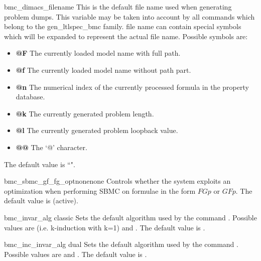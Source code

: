 \begin{nusmvVar} {bmc\_dimacs\_filename}{}{}
This is the default file name used when generating \dimacs problem
dumps. This variable may be taken into account by all commands which
belong to the gen\_ltlspec\_bmc family.  \dimacs file name can contain
special symbols which will be expanded to represent the actual file
name. Possible symbols are:

\begin{itemize}
\item {\bf @F}
The currently loaded model name with full path.
\item {\bf @f}
The currently loaded model name without path part.
\item {\bf @n}
The numerical index of the currently processed formula in the property
database.
\item {\bf @k}
The currently generated problem length.
\item {\bf @l}
The currently generated problem loopback value.
\item {\bf @@}
The `@' character.
\end{itemize}

The default value is ``".
\end{nusmvVar}

\begin{nusmvVar} {bmc\_sbmc\_gf\_fg\_opt}{none}{none}
Controls whether the system exploits an optimization when performing
SBMC on formulae in the form $F G p$ or $G F p$. The default value is
 (active).
\end{nusmvVar}








\label{bmc::dual}

\begin{nusmvVar} {bmc\_invar\_alg}
{}{classic}
Sets the default algorithm used by the command .
Possible values are  (i.e. k-induction with k=1) and .
The default value is .
\end{nusmvVar}

\begin{nusmvVar} {bmc\_inc\_invar\_alg}
{}{dual}
Sets the default algorithm used by the command .
Possible values are  and .
The default value is .
\end{nusmvVar}

